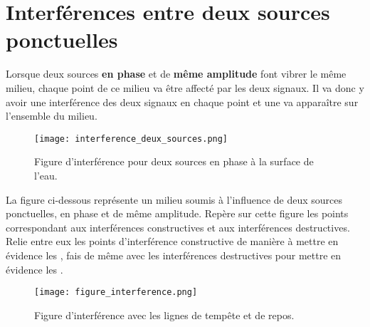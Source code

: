 \newpage

\section{Interférences entre deux sources ponctuelles}
Lorsque deux sources \textbf{en phase} et de \textbf{même amplitude} font vibrer le même milieu, chaque point de ce milieu va être affecté par les deux signaux. Il va donc y avoir une interférence des deux signaux en chaque point et une  va apparaître sur l'ensemble du milieu.

\begin{figure}[h]
    \centering
    \texttt{[image: interference\_deux\_sources.png]}
    \caption{Figure d'interférence pour deux sources en phase à la surface de l'eau.}
\end{figure}

\newpage

La figure ci-dessous représente un milieu soumis à l'influence de deux sources ponctuelles, en phase et de même amplitude. Repère sur cette figure les points correspondant aux interférences constructives et aux interférences destructives. Relie entre eux les points d'interférence constructive de manière à mettre en évidence les , fais de même avec les interférences destructives pour mettre en évidence les .

\hfill \break


\newpage

\begin{figure}[h]
    \centering
    \texttt{[image: figure\_interference.png]}
    \caption{Figure d'interférence avec les lignes de tempête et de repos.}
\end{figure}

